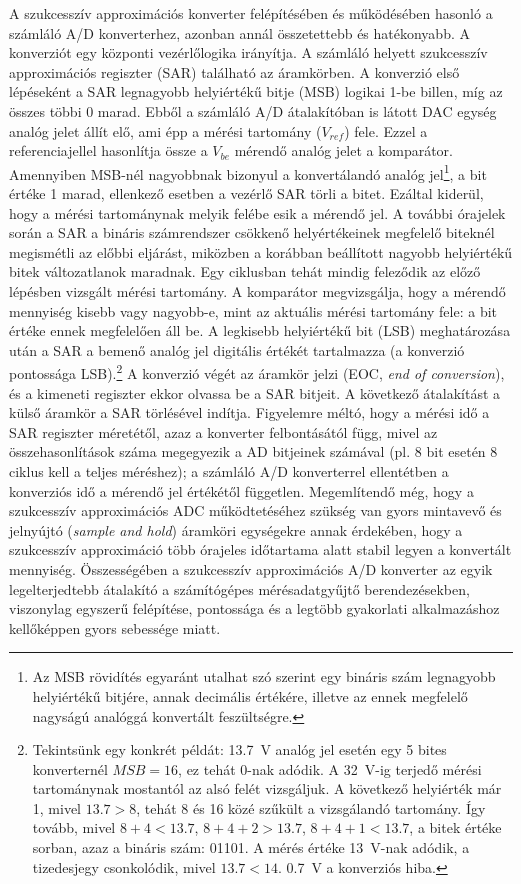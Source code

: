 \documentclass[12pt]{article}
\theoremstyle{plain}
\begin{document}
A szukcesszív approximációs konverter felépítésében és működésében hasonló a számláló A/D konverterhez, azonban annál összetettebb és hatékonyabb. A konverziót egy központi vezérlőlogika irányítja. A számláló helyett szukcesszív approximációs regiszter (SAR) található az áramkörben. A konverzió első lépéseként a SAR legnagyobb helyiértékű bitje (MSB) logikai 1-be billen, míg az összes többi 0 marad. Ebből a számláló A/D átalakítóban is látott DAC egység analóg jelet állít elő, ami épp a mérési tartomány ($V_{ref}$) fele. Ezzel a referenciajellel hasonlítja össze a $V_{be}$ mérendő analóg jelet a komparátor. Amennyiben MSB-nél nagyobbnak bizonyul a konvertálandó analóg jel\footnote{Az MSB rövidítés egyaránt utalhat szó szerint egy bináris szám legnagyobb helyiértékű bitjére, annak decimális értékére, illetve az ennek megfelelő nagyságú analóggá konvertált feszültségre.}, a bit értéke 1 marad, ellenkező esetben a vezérlő SAR törli a bitet. Ezáltal kiderül, hogy a mérési tartománynak melyik felébe esik a mérendő jel. 
A további órajelek során a SAR a bináris számrendszer csökkenő helyértékeinek megfelelő biteknél megismétli az előbbi eljárást, miközben a korábban beállított nagyobb helyiértékű bitek változatlanok maradnak. Egy ciklusban tehát mindig feleződik az előző lépésben vizsgált mérési tartomány. A komparátor megvizsgálja, hogy a mérendő mennyiség kisebb vagy nagyobb-e, mint az aktuális mérési tartomány fele: a bit értéke ennek megfelelően áll be. A legkisebb helyiértékű bit (LSB) meghatározása után a SAR a bemenő analóg jel digitális értékét tartalmazza (a konverzió pontossága LSB).\footnote{Tekintsünk egy konkrét példát: 13.7~V analóg jel esetén egy 5 bites konverternél $MSB=16$, ez tehát 0-nak adódik. A 32~V-ig terjedő mérési tartománynak mostantól az alsó felét vizsgáljuk. A következő helyiérték már 1, mivel $13.7>8$, tehát 8 és 16 közé szűkült a vizsgálandó tartomány. Így tovább, mivel $8+4<13.7$, $8+4+2>13.7$, $8+4+1<13.7$, a bitek értéke sorban, azaz a bináris szám: 01101. A mérés értéke 13~V-nak adódik, a tizedesjegy csonkolódik, mivel $13.7<14$. 0.7~V a konverziós hiba.}
A konverzió végét az áramkör jelzi (EOC, \textit{end of conversion}), és a kimeneti regiszter ekkor olvassa be a SAR bitjeit. A következő átalakítást a külső áramkör a SAR törlésével indítja.
Figyelemre méltó, hogy a mérési idő a SAR regiszter méretétől, azaz a konverter felbontásától függ, mivel az összehasonlítások száma megegyezik a AD bitjeinek számával (pl. 8 bit esetén 8 ciklus kell a teljes méréshez); a számláló A/D konverterrel ellentétben a konverziós idő a mérendő jel értékétől független. Megemlítendő még, hogy a szukcesszív approximációs ADC működtetéséhez szükség van gyors mintavevő és jelnyújtó (\textit{sample and hold}) áramköri egységekre annak érdekében, hogy a szukcesszív approximáció több órajeles időtartama alatt stabil legyen a konvertált mennyiség. Összességében a szukcesszív approximációs A/D konverter az egyik legelterjedtebb átalakító a számítógépes mérésadatgyűjtő berendezésekben, viszonylag egyszerű felépítése, pontossága és a legtöbb gyakorlati alkalmazáshoz kellőképpen gyors sebessége miatt.
\end{document}
